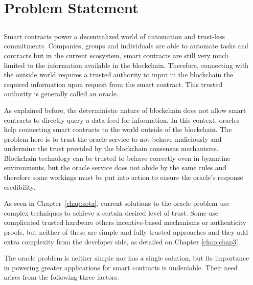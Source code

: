 \chapter{Problem Statement}\label{chap:chap4}

\section*{}


Smart contracts power a decentralized world of automation and trust-less commitments. Companies, groups and individuals are able to automate tasks and contracts but in the current ecosystem, smart contracts are still very much limited to the information available in the blockchain. Therefore, connecting with the outside world requires a trusted authority to input in the blockchain the required information upon request from the smart contract. This trusted authority is generally called an oracle.

As explained before, the deterministic nature of blockchain does not allow smart contracts to directly query a data-feed for information. In this context, oracles help connecting smart contracts to the world outside of the blockchain. The problem here is to trust the oracle service to not behave maliciously and undermine the trust provided by the blockchain consensus mechanisms. Blockchain technology can be trusted to behave correctly even in byzantine environments, but the oracle service does not abide by the same rules and therefore some workings must be put into action to ensure the oracle's response credibility.

As seen in Chapter~\ref{chap:sota}, current solutions to the oracle problem use complex techniques to achieve a certain desired level of trust. Some use complicated trusted hardware others incentive-based mechanisms or authenticity proofs, but neither of these are simple and fully trusted approaches and they add extra complexity from the developer side, as detailed on Chapter \ref{chap:chap3}.

The oracle problem is neither simple nor has a single solution, but its importance in powering greater applications for smart contracts  is undeniable. Their need arises from the following three factors.

